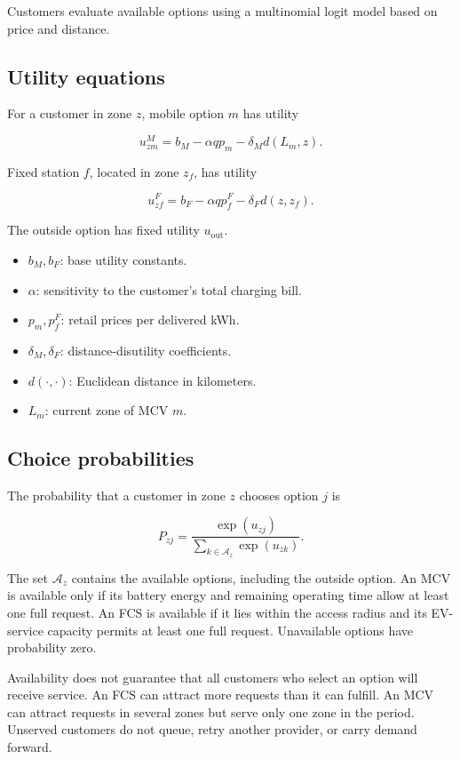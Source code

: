 \documentclass[11pt,letterpaper]{article}
\begin{document}
Customers evaluate available options using a multinomial logit model based on price and distance.

\subsection*{Utility equations}


For a customer in zone $z$, mobile option $m$ has utility

\[
u^M_{zm}=b_M-\alpha q p_m-\delta_M d(L_m,z).
\]


Fixed station $f$, located in zone $z_f$, has utility

\[
u^F_{zf}=b_F-\alpha q p^F_f-\delta_F d(z,z_f).
\]


The outside option has fixed utility $u_{\mathrm{out}}$.

\begin{itemize}
\setlength{\itemsep}{1pt}
\item $b_M,b_F$: base utility constants.
\item $\alpha$: sensitivity to the customer's total charging bill.
\item $p_m,p^F_f$: retail prices per delivered kWh.
\item $\delta_M,\delta_F$: distance-disutility coefficients.
\item $d(\cdot,\cdot)$: Euclidean distance in kilometers.
\item $L_m$: current zone of MCV $m$.
\end{itemize}


\subsection*{Choice probabilities}


The probability that a customer in zone $z$ chooses option $j$ is

\[
P_{zj}=
\frac{\exp(u_{zj})}
{\sum_{k\in\mathcal{A}_z}\exp(u_{zk})}.
\]


The set $\mathcal{A}_z$ contains the available options, including the outside option. An MCV is available only if its battery energy and remaining operating time allow at least one full request. An FCS is available if it lies within the access radius and its EV-service capacity permits at least one full request. Unavailable options have probability zero.

Availability does not guarantee that all customers who select an option will receive service. An FCS can attract more requests than it can fulfill. An MCV can attract requests in several zones but serve only one zone in the period. Unserved customers do not queue, retry another provider, or carry demand forward.
\end{document}
